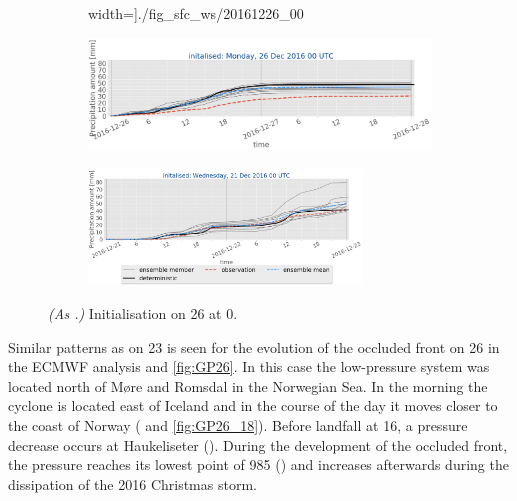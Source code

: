 \begin{figure}[H]
\begin{subfigure}[b]{0.9\textwidth}
		width=\textwidth]{./fig_sfc_ws/20161226_00}
		\caption{}\label{fig:res:sfc_ws26}
	\end{subfigure}
	\begin{subfigure}[b]{0.9\textwidth}
		\includegraphics[trim={0.cm 1.5cm 0cm 0cm},clip,
		width=\textwidth]{./fig_sfc_precip/20161226_00}
		\caption{}\label{fig:res:sfc_precip26}
	\end{subfigure}
	\begin{subfigure}[b]{\textwidth}
		\centering
		\includegraphics[trim={5.5cm 0cm 5.cm 17.7cm},clip,
		width=0.8\textwidth]{./fig_sfc_precip/20161221_00_label}
	\end{subfigure}
	\caption{\textit{(As .)} Initialisation on \SI{26}{\dec} at \SI{0}{\UTC}.}\label{fig:obs_meps:26}
\end{figure}
\noindent
Similar patterns as on \SI{23}{\dec} is seen for the evolution of the occluded front on \SI{26}{\dec} in the ECMWF analysis  and \ref{fig:GP26}. In this case the low-pressure system was located north of Møre and Romsdal in the Norwegian Sea. In the morning the cyclone is located east of Iceland and in the course of the day it moves closer to the coast of Norway ( and \ref{fig:GP26_18}). Before landfall at \SI{16}{\UTC}, a pressure decrease occurs at Haukeliseter (). During the development of the occluded front, the pressure reaches its lowest point of \SI{985}{\hPa} () and increases afterwards during the dissipation of the 2016 Christmas storm. 
